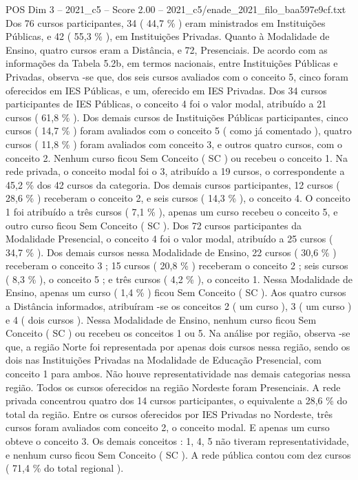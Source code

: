 \begin{textsample}{POS Dim 3 – 2021\_c5 – Score 2.00 – 2021\_c5/enade\_2021\_filo\_baa597e9cf.txt}
Dos 76 cursos participantes, 34 ( 44,7 \% ) eram ministrados em Instituições Públicas, e 42 ( 55,3 \% ), em Instituições Privadas.
Quanto à Modalidade de Ensino, quatro cursos eram a Distância, e 72, Presenciais.
De acordo com as informações da Tabela 5.2b, em termos nacionais, entre Instituições Públicas e Privadas, observa -se que, dos seis cursos avaliados com o conceito 5, cinco foram oferecidos em IES Públicas, e um, oferecido em IES Privadas.
Dos 34 cursos participantes de IES Públicas, o conceito 4 foi o valor modal, atribuído a 21 cursos ( 61,8 \% ).
Dos demais cursos de Instituições Públicas participantes, cinco cursos ( 14,7 \% ) foram avaliados com o conceito 5 ( como já comentado ), quatro cursos ( 11,8 \% ) foram avaliados com conceito 3, e outros quatro cursos, com o conceito 2.
Nenhum curso ficou Sem Conceito ( SC ) ou recebeu o conceito 1.
Na rede privada, o conceito modal foi o 3, atribuído a 19 cursos, o correspondente a 45,2 \% dos 42 cursos da categoria.
Dos demais cursos participantes, 12 cursos ( 28,6 \% ) receberam o conceito 2, e seis cursos ( 14,3 \% ), o conceito 4.
O conceito 1 foi atribuído a três cursos ( 7,1 \% ), apenas um curso recebeu o conceito 5, e outro curso ficou Sem Conceito ( SC ).
Dos 72 cursos participantes da Modalidade Presencial, o conceito 4 foi o valor modal, atribuído a 25 cursos ( 34,7 \% ).
Dos demais cursos nessa Modalidade de Ensino, 22 cursos ( 30,6 \% ) receberam o conceito 3 ; 15 cursos ( 20,8 \% ) receberam o conceito 2 ; seis cursos ( 8,3 \% ), o conceito 5 ; e três cursos ( 4,2 \% ), o conceito 1.
Nessa Modalidade de Ensino, apenas um curso ( 1,4 \% ) ficou Sem Conceito ( SC ).
Aos quatro cursos a Distância informados, atribuíram -se os conceitos 2 ( um curso ), 3 ( um curso ) e 4 ( dois cursos ).
Nessa Modalidade de Ensino, nenhum curso ficou Sem Conceito ( SC ) ou recebeu os conceitos 1 ou 5.
Na análise por região, observa -se que, a região Norte foi representada por apenas dois cursos nessa região, sendo os dois nas Instituições Privadas na Modalidade de Educação Presencial, com conceito 1 para ambos.
Não houve representatividade nas demais categorias nessa região.
Todos os cursos oferecidos na região Nordeste foram Presenciais.
A rede privada concentrou quatro dos 14 cursos participantes, o equivalente a 28,6 \% do total da região.
Entre os cursos oferecidos por IES Privadas no Nordeste, três cursos foram avaliados com conceito 2, o conceito modal.
E apenas um curso obteve o conceito 3.
Os demais conceitos : 1, 4, 5 não tiveram representatividade, e nenhum curso ficou Sem Conceito ( SC ).
A rede pública contou com dez cursos ( 71,4 \% do total regional ).

\end{textsample}
